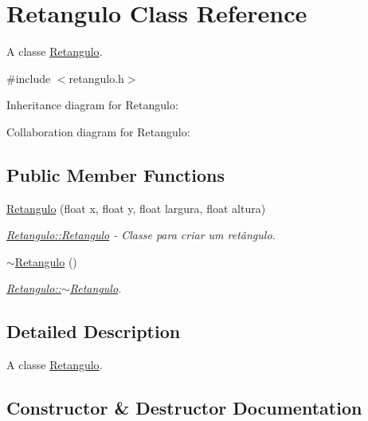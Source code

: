 \hypertarget{classRetangulo}{}\section{Retangulo Class Reference}
\label{classRetangulo}


A classe \hyperlink{classRetangulo}{Retangulo}.  




{\ttfamily \#include $<$retangulo.\+h$>$}



Inheritance diagram for Retangulo\+:


Collaboration diagram for Retangulo\+:
\subsection*{Public Member Functions}
\begin{DoxyCompactItemize}
\item 
\hyperlink{classRetangulo_acca1dd211eefc8dc04658c943c0d1122}{Retangulo} (float x, float y, float largura, float altura)
\begin{DoxyCompactList}\small\item\em \hyperlink{classRetangulo_acca1dd211eefc8dc04658c943c0d1122}{Retangulo\+::\+Retangulo} -\/ Classe para criar um retângulo. \end{DoxyCompactList}\item 
\mbox{\label{classRetangulo_a52b1a7f23e13a531a30526825b164615}} 
\hyperlink{classRetangulo_a52b1a7f23e13a531a30526825b164615}{$\sim$\+Retangulo} ()
\begin{DoxyCompactList}\small\item\em \hyperlink{classRetangulo_a52b1a7f23e13a531a30526825b164615}{Retangulo\+::$\sim$\+Retangulo}. \end{DoxyCompactList}\end{DoxyCompactItemize}


\subsection{Detailed Description}
A classe \hyperlink{classRetangulo}{Retangulo}. 

\subsection{Constructor \& Destructor Documentation}
\mbox{\label{classRetangulo_acca1dd211eefc8dc04658c943c0d1122}} 
